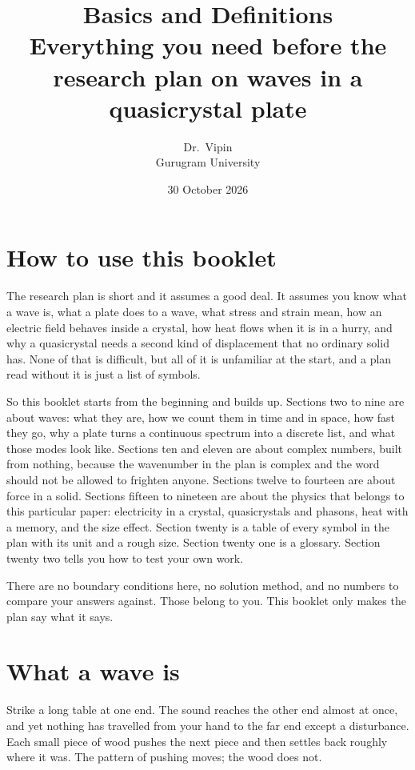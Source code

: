 \documentclass[11pt]{article}
\title{\vspace{-1.6cm}\Large Basics and Definitions\\[2pt]
\large Everything you need before the research plan on waves in a quasicrystal plate}
\author{Dr.\ Vipin \\ Gurugram University}
\date{30 October 2026}
\begin{document}
\maketitle
\vspace{-6mm}

\section{How to use this booklet}

The research plan is short and it assumes a good deal. It assumes you know what a wave is, what a plate does
to a wave, what stress and strain mean, how an electric field behaves inside a crystal, how heat flows when
it is in a hurry, and why a quasicrystal needs a second kind of displacement that no ordinary solid has. None
of that is difficult, but all of it is unfamiliar at the start, and a plan read without it is just a list of
symbols.

So this booklet starts from the beginning and builds up. Sections two to nine are about waves: what they are,
how we count them in time and in space, how fast they go, why a plate turns a continuous spectrum into a
discrete list, and what those modes look like. Sections ten and eleven are about complex numbers, built from
nothing, because the wavenumber in the plan is complex and the word should not be allowed to frighten anyone.
Sections twelve to fourteen are about force in a solid. Sections fifteen to nineteen are about the physics
that belongs to this particular paper: electricity in a crystal, quasicrystals and phasons, heat with a
memory, and the size effect. Section twenty is a table of every symbol in the plan with its unit and a rough
size. Section twenty one is a glossary. Section twenty two tells you how to test your own work.

There are no boundary conditions here, no solution method, and no numbers to compare your answers against.
Those belong to you. This booklet only makes the plan say what it says.

\section{What a wave is}

Strike a long table at one end. The sound reaches the other end almost at once, and yet nothing has travelled
from your hand to the far end except a disturbance. Each small piece of wood pushes the next piece and then
settles back roughly where it was. The pattern of pushing moves; the wood does not.
\end{document}
